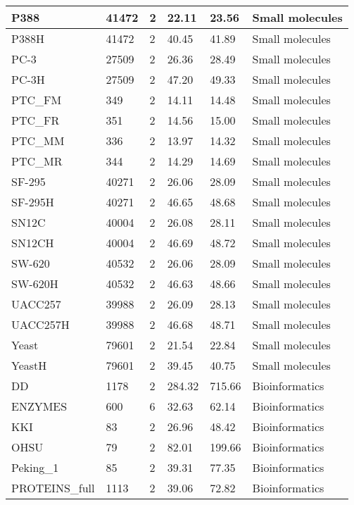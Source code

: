 \documentclass{article}
\begin{document}
\begin{table}[!ht]
\begin{tabular}{|l|l|l|l|l|l|}
        P388 & 41472 & 2 & 22.11 & 23.56 & Small molecules \\ \hline
        P388H & 41472 & 2 & 40.45 & 41.89 & Small molecules \\ \hline
        PC-3 & 27509 & 2 & 26.36 & 28.49 & Small molecules \\ \hline
        PC-3H & 27509 & 2 & 47.20 & 49.33 & Small molecules \\ \hline
        PTC\_FM & 349 & 2 & 14.11 & 14.48 & Small molecules \\ \hline
        PTC\_FR & 351 & 2 & 14.56 & 15.00 & Small molecules \\ \hline
        PTC\_MM & 336 & 2 & 13.97 & 14.32 & Small molecules \\ \hline
        PTC\_MR & 344 & 2 & 14.29 & 14.69 & Small molecules \\ \hline
        SF-295 & 40271 & 2 & 26.06 & 28.09 & Small molecules \\ \hline
        SF-295H & 40271 & 2 & 46.65 & 48.68 & Small molecules \\ \hline
        SN12C & 40004 & 2 & 26.08 & 28.11 & Small molecules \\ \hline
        SN12CH & 40004 & 2 & 46.69 & 48.72 & Small molecules \\ \hline
        SW-620 & 40532 & 2 & 26.06 & 28.09 & Small molecules \\ \hline
        SW-620H & 40532 & 2 & 46.63 & 48.66 & Small molecules \\ \hline
        UACC257 & 39988 & 2 & 26.09 & 28.13 & Small molecules \\ \hline
        UACC257H & 39988 & 2 & 46.68 & 48.71 & Small molecules \\ \hline
        Yeast & 79601 & 2 & 21.54 & 22.84 & Small molecules \\ \hline
        YeastH & 79601 & 2 & 39.45 & 40.75 & Small molecules \\ \hline
        DD & 1178 & 2 & 284.32 & 715.66 & Bioinformatics \\ \hline
        ENZYMES & 600 & 6 & 32.63 & 62.14 & Bioinformatics \\ \hline
        KKI & 83 & 2 & 26.96 & 48.42 & Bioinformatics \\ \hline
        OHSU & 79 & 2 & 82.01 & 199.66 & Bioinformatics \\ \hline
        Peking\_1 & 85 & 2 & 39.31 & 77.35 & Bioinformatics \\ \hline
        PROTEINS\_full & 1113 & 2 & 39.06 & 72.82 & Bioinformatics \\ \hline

\end{tabular}
\end{table}
\end{document}
